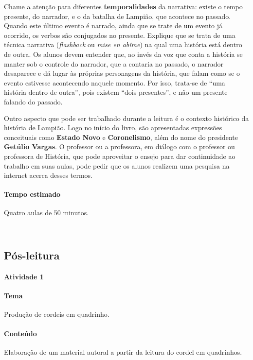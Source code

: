 \documentclass[11pt]{extarticle}
\begin{document}
Chame a atenção para diferentes \textbf{temporalidades} da narrativa: existe o tempo presente, do narrador,
e o da batalha de Lampião, que acontece no passado. Quando este último evento é narrado, ainda que 
se trate de um evento já ocorrido, os verbos são conjugados no presente. 
Explique que se trata de uma técnica narrativa (\textit{flashback} ou \textit{mise en abîme}) na qual uma história
está dentro de outra. Os alunos devem entender que, ao invés da voz que conta a história se manter 
sob o controle do narrador, que a contaria no passado, o narrador desaparece e dá lugar às próprias 
personagens da história, que falam como se o evento estivesse acontecendo naquele momento. 
Por isso, trata-se de ``uma história dentro de outra'', pois existem ``dois presentes'', e não
um presente falando do passado. 

Outro aspecto que pode ser trabalhado durante a leitura é o contexto histórico da história de Lampião. Logo no início do livro, são apresentadas expressões conceituais como \textbf{Estado Novo} e \textbf{Coronelismo}, além do nome do presidente \textbf{Getúlio Vargas}. O professor ou a professora, em diálogo com o professor ou professora
de História, que pode aproveitar o ensejo para dar continuidade ao trabalho em suas aulas,
pode pedir que os alunos realizem uma pesquisa na internet acerca desses termos.


\paragraph{Tempo estimado} Quatro aulas de 50 minutos.

 
\subsection{Pós-leitura}

\paragraph{Atividade 1}


\paragraph{Tema} Produção de cordeis em quadrinho.

\paragraph{Conteúdo} Elaboração de um material autoral a partir da leitura
do cordel em quadrinhos.
\end{document}

